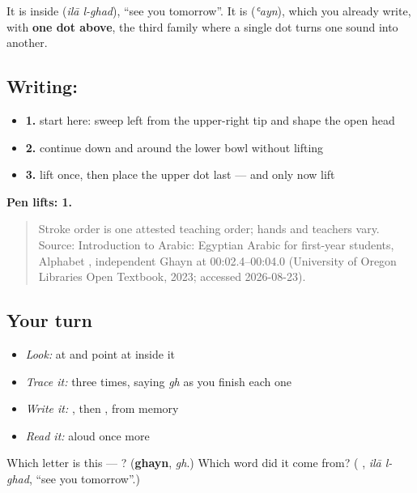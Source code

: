 It is inside \textbf{ } (\emph{ilā l-ghad}), \textquotedblleft{}see you tomorrow\textquotedblright{}. It is \textbf{} (\emph{ʿayn}), which you already write, with \textbf{one dot above}, the third family where a single dot turns one sound into another.

\subsection*{Writing: }

\begin{itemize}
\raggedright
  \item \textbf{1.} start here: sweep left from the upper-right tip and shape the open head
  \item \textbf{2.} continue down and around the lower bowl without lifting
  \item \textbf{3.} lift once, then place the upper dot last — and only now lift
\end{itemize}

\textbf{Pen lifts: 1.}

\begin{quote}
Stroke order is one attested teaching order; hands and teachers vary. Source: Introduction to Arabic: Egyptian Arabic for first-year students, Alphabet  , independent Ghayn at 00:02.4–00:04.0 (University of Oregon Libraries Open Textbook, 2023; accessed 2026-08-23).
\end{quote}

\subsection*{Your turn}
\begin{itemize}
\raggedright
  \item \emph{Look:} at \textbf{ } and point at  inside it
  \item \emph{Trace it:}  three times, saying \emph{gh} as you finish each one
  \item \emph{Write it:} , then , from memory
  \item \emph{Read it:} \textbf{ } aloud once more
\end{itemize}

\begin{tcolorbox}[breakable,colback=teal!4,colframe=teal!35!black,title={Before you move on}]
Which letter is this — ? (\textbf{ghayn}, \emph{gh}.) Which word did it come from? (\textbf{ }, \emph{ilā l-ghad}, \textquotedblleft{}see you tomorrow\textquotedblright{}.)
\end{tcolorbox}
